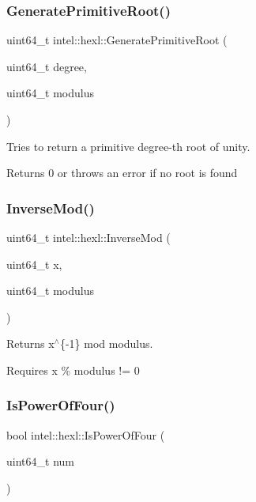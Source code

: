 \subsubsection{\texorpdfstring{Generate\+Primitive\+Root()}{GeneratePrimitiveRoot()}}
{\footnotesize\ttfamily uint64\+\_\+t intel\+::hexl\+::\+Generate\+Primitive\+Root (\begin{DoxyParamCaption}\item[{uint64\+\_\+t}]{degree,  }\item[{uint64\+\_\+t}]{modulus }\end{DoxyParamCaption})}



Tries to return a primitive degree-\/th root of unity. 

Returns 0 or throws an error if no root is found \mbox{\label{namespaceintel_1_1hexl_ac949027d43c64d65400c93a148d349c6}} 
\subsubsection{\texorpdfstring{Inverse\+Mod()}{InverseMod()}}
{\footnotesize\ttfamily uint64\+\_\+t intel\+::hexl\+::\+Inverse\+Mod (\begin{DoxyParamCaption}\item[{uint64\+\_\+t}]{x,  }\item[{uint64\+\_\+t}]{modulus }\end{DoxyParamCaption})}



Returns x$^\wedge$\{-\/1\} mod modulus. 

Requires x \% modulus != 0 \mbox{\label{namespaceintel_1_1hexl_a74a77227ebbd892a0cff5089f3d89010}} 
\subsubsection{\texorpdfstring{Is\+Power\+Of\+Four()}{IsPowerOfFour()}}
{\footnotesize\ttfamily bool intel\+::hexl\+::\+Is\+Power\+Of\+Four (\begin{DoxyParamCaption}\item[{uint64\+\_\+t}]{num }\end{DoxyParamCaption})\hspace{0.3cm}{\ttfamily [inline]}}


